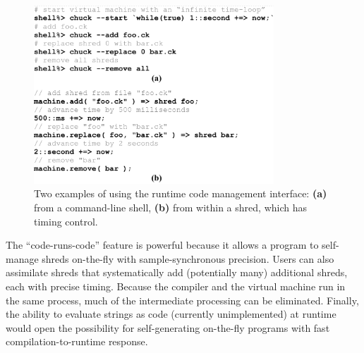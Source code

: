 \begin{figure}[t]
\centering
\includegraphics[width=90mm]{fig6.png}
\caption{Two examples of using the runtime code management interface:\textbf{ (a)} from a command-line shell, \textbf{(b)} from within a shred, which has timing control.}
\label{Wang:img-6}
\end{figure}






The ``code-runs-code'' feature is powerful because it allows a program to self-manage shreds on-the-fly with sample-synchronous precision.  Users can also assimilate shreds that systematically add (potentially many) additional shreds, each with precise timing.  Because the compiler and the virtual machine run in the same process, much of the intermediate processing can be eliminated. Finally, the ability to evaluate strings as code (currently unimplemented) at runtime would open the possibility for self-generating on-the-fly programs with fast compilation-to-runtime response.

